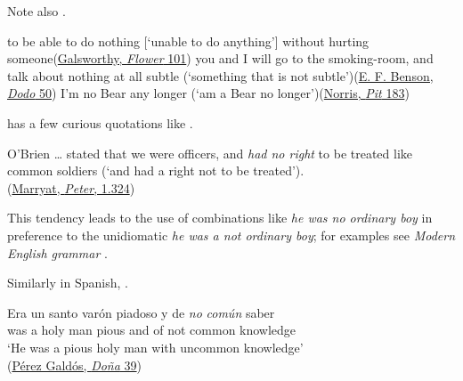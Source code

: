 Note also .

\ea \label{ex:06-14}
\ea to be able to do nothing [`unable to do anything'] without hurting someone\hfill(\href{https://archive.org/details/darkflower0000john_y2w0/page/104/mode/2up?q=%22without+hurting+someone%22&view=theater}{Galsworthy, \textit{Flower} 101})
\ex you and I will go to the smoking-room, and talk about nothing at all subtle \phantom{x} (`something that is not subtle')\hfill(\href{https://archive.org/details/dododetailofday00bensuoft/page/54/mode/2up?view=theater&q=%22you+and+I+will+go%22}{E. F. Benson, \textit{Dodo} 50})
\ex I'm no Bear any longer \phantom{x} (`am a Bear no longer')\hfill(\href{https://archive.org/details/pitepicofwheatde00norruoft/page/144/mode/2up?view=theater&q=%22I%27m+no+Bear%22}{Norris, \textit{Pit} 183})
\z
\z

\citet[\href{https://archive.org/details/p2englischephilo01storuoft/page/694/mode/2up?q=\%22had+no+right+to+be+treated+like+common+soldiers\%22&view=theater}{694}]{storm1896englische} has a few curious quotations like .

\ea \label{ex:06-17}
O'Brien {\dots} stated that we were officers, and \textit{had no right} to be treated like common soldiers \phantom{x} (`and had a right not to be treated').\\\hfill(\href{https://archive.org/details/petersimple01mar/page/324/mode/2up?q=\%22stated+that\%22&view=theater}{Marryat, \textit{Peter}, 1.324}) %
\z

This tendency leads to the use of combinations like \textit{he was no ordinary boy} in preference to the unidiomatic \textit{he was a not ordinary boy}; for examples see \textit{Modern English grammar} \citep[\href{https://archive.org/details/jespersen-1954-a-modern-english-grammar-on-historical-principles-part-ii-syntax-first-volume/page/426/mode/2up?view=theater}{16.751}]{jespersenMEG2}. %

Similarly in Spanish, .

\ea \label{ex:06-18}
 \gll Era un santo varón piadoso y de \textit{no} \textit{común} saber\\
 was a holy man pious and of not common knowledge\\
\glt `He was a pious holy man with uncommon knowledge'\\\hfill(\href{https://archive.org/details/Donaperfecta/page/n39/mode/2up?q=%22var%C3%B3n+piadoso%22&view=theater}{Pérez Galdós, \textit{Doña} 39})
\z

